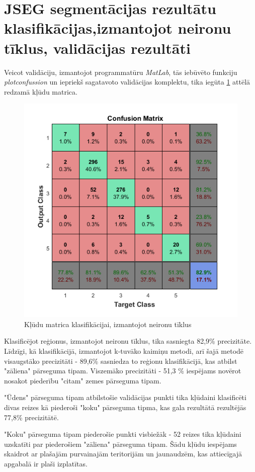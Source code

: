 \documentclass[12pt,paper=a4]{report}
\begin{document}
\section{JSEG segmentācijas rezultātu klasifikācijas,izmantojot neironu tīklus, validācijas rezultāti}
Veicot validāciju, izmantojot programmatūru \textit{MatLab}, tās iebūvēto funkciju \textit{plotconfussion} un iepriekš sagatavoto validācijas komplektu, tika iegūta \ref{fig:NNconfMatrix} attēlā redzamā kļūdu matrica. 
\begin{figure}[h!]
\centering
\includegraphics[width=.7\linewidth]{NNconfMatrix}
\caption{Kļūdu matrica klasifikācijai, izmantojot neironu tīklus}
\label{fig:NNconfMatrix}
\end{figure}\par
Klasificējot reģionus, izmantojot neironu tīklus, tika sasniegta 82,9\% precizitāte. Līdzīgi, kā klasifikācijā, izmantojot k-tuvāko kaimiņu metodi, arī šajā metodē visaugstāko precizitāti - 89,6\% sasniedza to reģionu klasifikācijā, kas atbilst "zāliena" pārseguma tipam. Viszemāko precizitāti - 51,3 \% iespējams novērot nosakot piederību "citam" zemes pārseguma tipam.\par
"Ūdens" pārseguma tipam atbilstošie validācijas punkti tika kļūdaini klasificēti divas reizes kā piederoši "koku" pārseguma tipma, kas gala rezultātā rezultējās 77,8\% precizitātē.\par 
"Koku" pārseguma tipam piederošie punkti visbiežāk - 52 reizes tika kļūdaini uzskatīti par piederošiem "zāliena" pārseguma tipam. Šādu kļūdu iespējams skaidrot ar plašajām purvainajām teritorijām un jaunaudzēm, kas attiecīgajā apgabalā ir plaši izplatītas.\par
\end{document}
